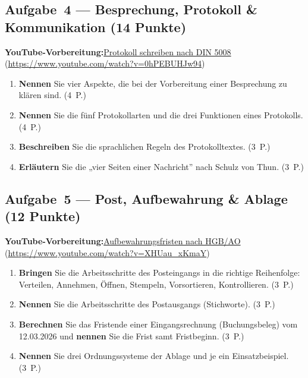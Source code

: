 \documentclass[11pt, a4paper]{article}
\begin{document}
\subsection*{Aufgabe~4 --- Besprechung, Protokoll \& Kommunikation (14 Punkte)}

\noindent\textbf{\color{bfwAccent}YouTube-Vorbereitung:}\enspace \href{https://www.youtube.com/watch?v=0hPEBUHJw94}{Protokoll schreiben nach DIN 5008} (\url{https://www.youtube.com/watch?v=0hPEBUHJw94})

\medskip
\begin{enumerate}[label=(\alph*)]
  \item \textbf{Nennen} Sie vier Aspekte, die bei der Vorbereitung einer Besprechung zu klären sind. \hfill (4~P.)
  \item \textbf{Nennen} Sie die fünf Protokollarten und die drei Funktionen eines Protokolls. \hfill (4~P.)
  \item \textbf{Beschreiben} Sie die sprachlichen Regeln des Protokolltextes. \hfill (3~P.)
  \item \textbf{Erläutern} Sie die „vier Seiten einer Nachricht'' nach Schulz von Thun. \hfill (3~P.)
\end{enumerate}

\subsection*{Aufgabe~5 --- Post, Aufbewahrung \& Ablage (12 Punkte)}

\noindent\textbf{\color{bfwAccent}YouTube-Vorbereitung:}\enspace \href{https://www.youtube.com/watch?v=XHUau_xKmaY}{Aufbewahrungsfristen nach HGB/AO} (\url{https://www.youtube.com/watch?v=XHUau_xKmaY})

\medskip
\begin{enumerate}[label=(\alph*)]
  \item \textbf{Bringen} Sie die Arbeitsschritte des Posteingangs in die richtige Reihenfolge: Verteilen, Annehmen, Öffnen, Stempeln, Vorsortieren, Kontrollieren. \hfill (3~P.)
  \item \textbf{Nennen} Sie die Arbeitsschritte des Postausgangs (Stichworte). \hfill (3~P.)
  \item \textbf{Berechnen} Sie das Fristende einer Eingangsrechnung (Buchungsbeleg) vom 12.03.2026 und \textbf{nennen} Sie die Frist samt Fristbeginn. \hfill (3~P.)
  \item \textbf{Nennen} Sie drei Ordnungssysteme der Ablage und je ein Einsatzbeispiel. \hfill (3~P.)
\end{enumerate}
\end{document}
